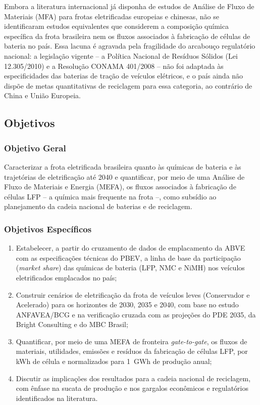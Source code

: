 Embora a literatura internacional já disponha de estudos de Análise de Fluxo
de Materiais (MFA) para frotas eletrificadas europeias e chinesas, não se
identificaram estudos equivalentes que considerem a composição química
específica da frota brasileira nem os fluxos associados à fabricação de células
de bateria no país. Essa lacuna é agravada pela fragilidade do arcabouço
regulatório nacional: a legislação vigente -- a Política Nacional de Resíduos
Sólidos (Lei 12.305/2010) e a Resolução CONAMA 401/2008
\cite{pnrs2010,conama2008} -- não foi adaptada às especificidades das baterias
de tração de veículos elétricos, e o país ainda não dispõe de metas
quantitativas de reciclagem para essa categoria, ao contrário de China e União
Europeia.

\subsection{Objetivos}
\label{subsec:objetivos}

\subsubsection*{Objetivo Geral}

Caracterizar a frota eletrificada brasileira quanto às químicas de bateria e às
trajetórias de eletrificação até 2040 e quantificar, por meio de uma Análise de
Fluxo de Materiais e Energia (MEFA), os fluxos associados à fabricação de
células LFP -- a química mais frequente na frota --, como subsídio ao
planejamento da cadeia nacional de baterias e de reciclagem.

\subsubsection*{Objetivos Específicos}

\begin{enumerate}
    \item Estabelecer, a partir do cruzamento de dados de emplacamento da ABVE
    com as especificações técnicas do PBEV, a linha de base da participação
    (\textit{market share}) das químicas de bateria (LFP, NMC e NiMH) nos
    veículos eletrificados emplacados no país;

    \item Construir cenários de eletrificação da frota de veículos leves
    (Conservador e Acelerado) para os horizontes de 2030, 2035 e 2040, com base
    no estudo ANFAVEA/BCG e na verificação cruzada com as projeções do PDE 2035,
    da Bright Consulting e do MBC Brasil;

    \item Quantificar, por meio de uma MEFA de fronteira \textit{gate-to-gate},
    os fluxos de materiais, utilidades, emissões e resíduos da fabricação de
    células LFP, por kWh de célula e normalizados para 1~GWh de produção anual;

    \item Discutir as implicações dos resultados para a cadeia nacional de
    reciclagem, com ênfase na sucata de produção e nos gargalos econômicos e
    regulatórios identificados na literatura.
\end{enumerate}

